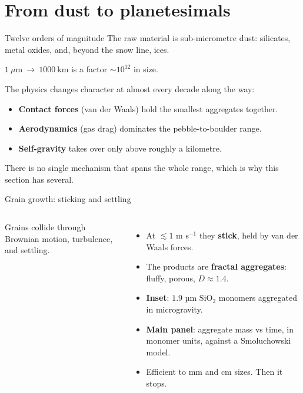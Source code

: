 \documentclass[aspectratio=169, 11pt]{beamer}
\begin{document}
\section{From dust to planetesimals}

\begin{frame}{Twelve orders of magnitude}
  The raw material is sub-micrometre dust: silicates, metal oxides, and, beyond the snow line, ices.
  \vskip8pt\relax
  \begin{center}
    \large
    $1\ \mu\mathrm{m}\ \longrightarrow\ 1000\ \mathrm{km}$ \qquad is a factor $\sim 10^{12}$ in size.
  \end{center}
  \vskip8pt\relax
  The physics changes character at almost every decade along the way:
  \begin{itemize}
    \item \textbf{Contact forces} (van der Waals) hold the smallest aggregates together.
    \item \textbf{Aerodynamics} (gas drag) dominates the pebble-to-boulder range.
    \item \textbf{Self-gravity} takes over only above roughly a kilometre.
  \end{itemize}
  \vskip4pt\relax
  There is no single mechanism that spans the whole range, which is why this section has several.
\end{frame}

\begin{frame}{Grain growth: sticking and settling}
  \begin{columns}[c]
    \column{\recapfigcolnarrow}
    \centering

    \column{\recaptextcolwide}
    Grains collide through Brownian motion, turbulence, and settling.
    \begin{itemize}
      \item At $\lesssim 1$ m s$^{-1}$ they \textbf{stick}, held by van der Waals forces.
      \item The products are \textbf{fractal aggregates}: fluffy, porous, $D \approx 1.4$.
      \item \textbf{Inset}: $1.9$ µm $\mathrm{SiO_2}$ monomers aggregated in microgravity.
      \item \textbf{Main panel}: aggregate mass vs time, in monomer units, against a Smoluchowski model.
      \item Efficient to mm and cm sizes. Then it stops.
    \end{itemize}
  \end{columns}
\end{frame}
\end{document}

